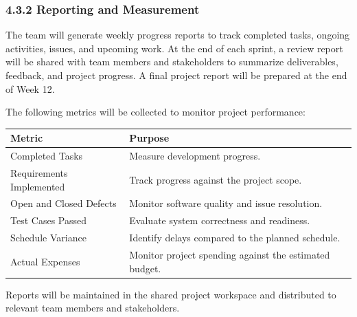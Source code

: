 \documentclass[12pt]{article}
\renewcommand{\baselinestretch}{1.5}
\begin{document}
\subsubsection*{4.3.2 Reporting and Measurement}
\par\medskip
The team will generate weekly progress reports to track completed tasks, ongoing activities, issues, and upcoming work. At the end of each sprint, a review report will be shared with team members and stakeholders to summarize deliverables, feedback, and project progress. A final project report will be prepared at the end of Week 12.
\par\medskip
The following metrics will be collected to monitor project performance:
\par\medskip
\begingroup
\scriptsize
\renewcommand{\baselinestretch}{1.0}\selectfont
\renewcommand{\arraystretch}{1.15}
\setlength{\tabcolsep}{4pt}
\begin{longtable}{|>{\raggedright\arraybackslash}p{}|>{\raggedright\arraybackslash}p{}|}
\hline
Metric & Purpose \\ \hline
\endhead
Completed Tasks & Measure development progress. \\ \hline
Requirements Implemented & Track progress against the project scope. \\ \hline
Open and Closed Defects & Monitor software quality and issue resolution. \\ \hline
Test Cases Passed & Evaluate system correctness and readiness. \\ \hline
Schedule Variance & Identify delays compared to the planned schedule. \\ \hline
Actual Expenses & Monitor project spending against the estimated budget. \\ \hline
\end{longtable}
\endgroup
\par\medskip
Reports will be maintained in the shared project workspace and distributed to relevant team members and stakeholders.
\par\medskip
\hypertarget{sec:433-risk-management}{}
\end{document}
